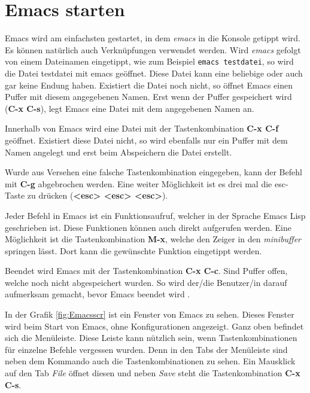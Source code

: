 \section{Emacs starten}
\label{sec:emacsstart}
Emacs wird am einfachsten gestartet, in dem \textit{emacs} in die
Konsole getippt wird. Es können natürlich auch Verknüpfungen verwendet
werden. Wird \textit{emacs} gefolgt von einem Dateinamen eingetippt,
wie zum Beispiel \texttt{emacs testdatei}, so wird die Datei
{\glqq}testdatei{\grqq} mit emacs geöffnet. Diese Datei kann eine
beliebige oder auch gar keine Endung haben. Existiert die Datei noch
nicht, so öffnet Emacs einen Puffer mit diesem angegebenen Namen. Erst
wenn der Puffer gespeichert wird (\textbf{C-x C-s}), legt Emacs eine
Datei mit dem angegebenen Namen an.

Innerhalb von Emacs wird eine Datei mit der Tastenkombination
\textbf{C-x C-f} geöffnet. Existiert diese Datei nicht, so wird
ebenfalls nur ein Puffer mit dem Namen angelegt und erst beim
Abspeichern die Datei erstellt.

Wurde aus Versehen eine falsche Tastenkombination eingegeben, kann der
Befehl mit \textbf{C-g} abgebrochen werden. Eine weiter Möglichkeit
ist es drei mal die esc-Taste zu drücken (\textbf{<esc> <esc> <esc>}).

Jeder Befehl in Emacs ist ein Funktionsaufruf, welcher in der Sprache
Emacs Lisp geschrieben ist. Diese Funktionen können auch direkt
aufgerufen werden. Eine Möglichkeit ist die Tastenkombination
\textbf{M-x}, welche den Zeiger in den \textit{minibuffer} springen
lässt. Dort kann die gewünschte Funktion eingetippt werden.

Beendet wird Emacs mit der Tastenkombination \textbf{C-x C-c}. Sind
Puffer offen, welche noch nicht abgespeichert wurden. So wird der/die
Benutzer/in darauf aufmerksam gemacht, bevor Emacs beendet wird
\cite{Hahn2016, CameronRosenblattRaymond1996}.

In der Grafik \ref{fig:Emacsscr} ist ein Fenster von Emacs zu sehen.
Dieses Fenster wird beim Start von Emacs, ohne Konfigurationen
angezeigt. Ganz oben befindet sich die Menüleiste. Diese Leiste kann
nützlich sein, wenn Tastenkombinationen für einzelne Befehle vergessen
wurden. Denn in den Tabs der Menüleiste sind neben dem Kommando auch
die Tastenkombinationen zu sehen. Ein Mausklick auf den Tab
\textit{File} öffnet diesen und neben \textit{Save} steht die
Tastenkombination \textbf{C-x C-s}.

